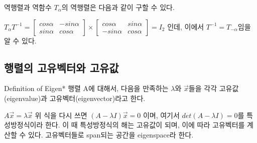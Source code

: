\documentclass{beamer}
\begin{document}
\begin{frame}{역행렬과 역함수} 
$T_{\alpha}$의 역행렬은 다음과 같이 구할 수 있다. 

$T_{\alpha} T^{-1}  = 
\left[ \begin{matrix}
cos \alpha & - sin \alpha  \\
sin \alpha & cos \alpha 
\end{matrix} \right] \times 
\left[ \begin{matrix}
cos \alpha & sin \alpha \\
- sin \alpha & cos \alpha
\end{matrix} \right] = I_2
$
인데, 이에서 $T^{-1} = T_{-\alpha}$임을 알 수 있다. 

\end{frame}


\subsection{행렬의 고유벡터와 고유값}


\begin{frame}{Definition of Eigen*} 
행렬 A에 대해서, 다음을 만족하는 $\lambda$와 $\vec{x}$들을 각각 고유값(eigenvalue)과 고유벡터(eigenvector)라고 한다. 
\vspace{5mm}

$ A \vec{x} = \lambda \vec{x}$ 
\vspace{5mm}
위 식을 다시 쓰면 
\vspace{5mm}
$ (A-\lambda I) \vec{x} = 0 $ 
\vspace{5mm}
이며, 여기서 $det(A-\lambda I)=0$를 특성방정식이라 한다. 이 때 특성방정식의 해는 고유값이 되며, 이에 따라 고유벡터를 계산할 수 있다. 
\vspace{5mm}
고유벡터들로 span되는 공간을 eigenspace라 한다. 
\end{frame}
\end{document}
